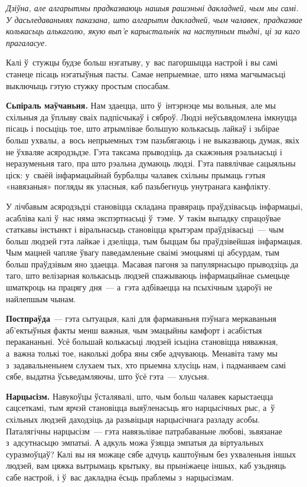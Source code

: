 \emph{Дзіўна, але алгарытмы прадказваюць нашыя рашэньні дакладней, чым мы самі. У дасьледаваньнях паказана, што алгарытм дакладней, чым чалавек, прадказвае колькасьць алькаголю, якую вып'е карыстальнік на наступным тыдні, ці за каго прагаласуе.} 

Калі ў~стужцы будзе больш нэгатыву, у~вас пагоршыцца настрой і вы самі станеце пісаць нэгатыўныя пасты. Самае непрыемнае, што няма магчымасьці выключыць гэтую стужку простым спосабам.

\textbf{Сьпіраль маўчаньня.} Нам здаецца, што ў~інтэрнэце мы вольныя, але мы схільныя да ўплыву сваіх падпісчыкаў і сяброў. Людзі неўсьвядомлена імкнуцца пісаць і посьціць тое, што атрымлівае большую колькасьць лайкаў і зьбірае больш ухвалы, а~вось непрыемных тэм пазьбягаюць і не выказваюць думак, якіх не ўхваляе асяродзьдзе. Гэта таксама прыводзіць да скажэньня рэальнасьці і неразуменьня таго, пра што рэальна думаюць людзі. Гэта павялічвае сацыяльны ціск: у~сваёй інфармацыйнай бурбалцы чалавек схільны прымаць гэтыя «навязаныя» погляды як уласныя, каб пазьбегнуць унутранага канфлікту.

У лічбавым асяродзьдзі становіцца складана правяраць праўдзівасьць інфармацыі, асабліва калі ў~нас няма экспэртнасьці ў~тэме. У такім выпадку спрацоўвае статкавы інстынкт і віральнасьць становіцца крытэрам праўдзівасьці~--- чым больш людзей гэта лайкае і дзеліцца, тым быццам бы праўдзівейшая інфармацыя. Чым мацней чапляе ўвагу паведамленьне сваімі эмоцыямі ці абсурдам, тым больш праўдзівым яно здаецца. Масавая пагоня за папулярнасьцю прыводзіць да таго, што велізарная колькасьць людзей спажываюць інфармацыйнае сьмецьце шматкроць на працягу дня~--- а~гэта адбіваецца на псыхічным здароўі не найлепшым чынам.

\textbf{Постпраўда}~--- гэта сытуацыя, калі для фармаваньня пэўнага меркаваньня аб'ектыўныя факты менш важныя, чым эмацыйны камфорт і асабістыя перакананьні. Усё большай колькасьці людзей ісьціна становіцца няважная, а~важна толькі тое, наколькі добра яны сябе адчуваюць. Менавіта таму мы з~задавальненьнем слухаем тых, хто прыемна хлусіць нам, і падманваем самі сябе, выдатна ўсьведамляючы, што ўсё гэта~--- хлусьня.

\textbf{Нарцысізм.} Навукоўцы ўсталявалі, што, чым больш чалавек карыстаецца сацсеткамі, тым ярчэй становіцца выяўленасьць яго нарцысічных рыс, а~ў схільных людзей даходзіць да разьвіцьця нарцысічнага разладу асобы. Паталягічны нарцысізм~--- гэта навязьлівае патрабаваньне любові, зьвязанае з~адсутнасьцю эмпатыі. А адкуль можа ўзяцца эмпатыя да віртуальных суразмоўцаў? Калі вы ня можаце сябе адчуць каштоўным без ухваленьня іншых людзей, вам цяжка вытрымаць крытыку, вы прыніжаеце іншых, каб узьдняць сабе настрой, і ў~вас дакладна ёсьць праблемы з~нарцысізмам.

